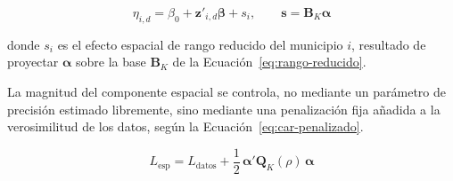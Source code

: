 \begin{equation}
    \eta_{i,d} = \beta_0 + \mathbf{z}'_{i,d}\boldsymbol{\beta} + s_i,
    \qquad \mathbf{s} = \mathbf{B}_K \boldsymbol{\alpha}
    \label{eq:car-predictor}
\end{equation}

\noindent donde $s_i$ es el efecto espacial de rango reducido del municipio $i$, resultado de proyectar $\boldsymbol{\alpha}$ sobre la base $\mathbf{B}_K$ de la Ecuación~\ref{eq:rango-reducido}.

La magnitud del componente espacial se controla, no mediante un parámetro de precisión estimado libremente, sino mediante una penalización fija añadida a la verosimilitud de los datos, según la Ecuación~\ref{eq:car-penalizado}.

\begin{equation}
    L_{\text{esp}} = L_{\text{datos}} + \frac{1}{2}\,\boldsymbol{\alpha}' \mathbf{Q}_K(\rho)\, \boldsymbol{\alpha}
    \label{eq:car-penalizado}
\end{equation}


